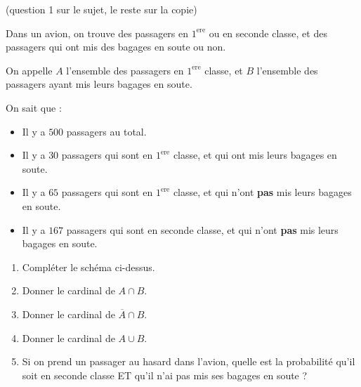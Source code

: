 \documentclass[
	classe=$1^{ere}STI2D$
]{évaluation}
\begin{document}
\begin{exercice} (question 1 sur le sujet, le reste sur la copie)

	Dans un avion, on trouve des passagers en $1^\text{ere}$ ou en seconde classe, et des passagers qui ont mis des bagages en soute ou non.

	On appelle $A$ l'ensemble des passagers en $1^\text{ere}$ classe, et $B$ l'ensemble des passagers ayant mis leurs bagages en soute.

	On sait que :\vspace{1em}

	\begin{minipage}{0.5\linewidth}
		\begin{itemize}
			\item Il y a $500$ passagers au total.
			\item Il y a $30$ passagers qui sont en $1^\text{ere}$ classe, et qui ont mis leurs bagages en soute.
			\item Il y a $65$ passagers qui sont en $1^\text{ere}$ classe, et qui n'ont \textbf{pas} mis leurs bagages en soute.
			\item Il y a $167$ passagers qui sont en seconde classe, et qui n'ont \textbf{pas} mis leurs bagages en soute.
		\end{itemize}
	\end{minipage}\hspace{1cm}
	\begin{minipage}{0.4\linewidth}
	\end{minipage}

	\begin{enumerate}
		\item Compléter le schéma ci-dessus.
		\item Donner le cardinal de $A ∩ B$. 
		\item Donner le cardinal de $\overline{A} ∩ B$. 
		\item Donner le cardinal de $A ∪ B$. 
		\item Si on prend un passager au hasard dans l'avion, quelle est la probabilité qu'il soit en seconde classe ET qu'il n'ai pas mis ses bagages en soute ? 
	\end{enumerate}
\end{exercice}
\end{document}
